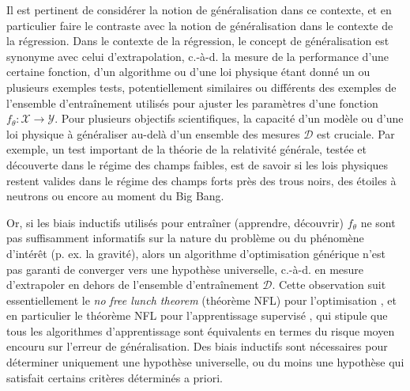 Il est pertinent de considérer la notion de généralisation dans ce contexte, et en particulier faire le contraste avec 
la notion de généralisation dans le contexte de la régression. Dans le contexte de la régression, le concept de généralisation est synonyme 
avec celui d'extrapolation, c.-à-d. la mesure de la performance d'une certaine fonction, d'un algorithme ou d'une loi physique 
étant donné un ou plusieurs exemples tests, 
potentiellement similaires ou différents des exemples de l'ensemble d'entraînement utilisés pour ajuster les paramètres d'une fonction 
$f_\theta: \mathcal{X} \rightarrow \mathcal{Y}$. Pour plusieurs objectifs scientifiques, la capacité d'un modèle ou d'une loi physique  
à généraliser au-delà d'un ensemble des mesures $\mathcal{D}$ est cruciale. 
Par exemple, un test important de la théorie de la relativité générale, testée et découverte dans le régime des champs faibles, est 
de savoir si les lois physiques restent valides dans le régime des champs forts près des trous noirs, des étoiles à neutrons ou encore 
au moment du Big Bang. 

Or, si les biais inductifs utilisés pour entraîner (apprendre, découvrir) $f_{\theta}$ ne sont pas suffisamment 
informatifs sur la nature du problème ou du phénomène d'intérêt (p. ex. la gravité), 
alors un algorithme d'optimisation générique n'est pas garanti de converger vers 
une hypothèse universelle, c.-à-d. en mesure d'extrapoler en dehors de l'ensemble 
d'entraînement $\mathcal{D}$.
Cette observation suit essentiellement le \textit{no free lunch theorem} (théorème NFL) pour 
l'optimisation \citep{Wolpert1997}, et en particulier 
le théorème NFL pour l'apprentissage supervisé \citep{Wolpert1992,Wolpert1996}, qui stipule que tous les 
algorithmes d'apprentissage %
sont équivalents en termes du risque moyen encouru sur l'erreur de généralisation. 
Des biais inductifs sont nécessaires pour déterminer uniquement une hypothèse universelle, 
ou du moins une hypothèse qui satisfait certains critères déterminés a priori.

